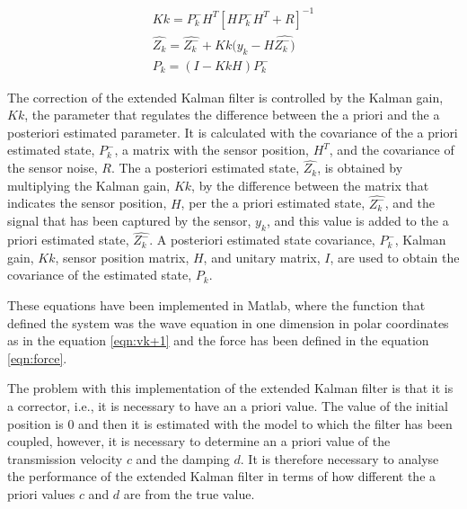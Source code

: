 \documentclass[12pt, a4paper]{article} %
\begin{document}
\begin{equation} \label{eqn:corrector}
    \begin{array}{ l }
    
    Kk = P_{k}^{-}H^{T}[HP_{k}^{-}H^{T} + R]^{-1} \\
    \hat{Z_{k}} = \hat{Z_{k}^{-}} + Kk(y_{k}-H\hat{Z_{k}^{-})} \\
    P_{k} = (I - KkH)P_{k}^{-}
    
    \end{array}
\end{equation}

The correction of the extended Kalman filter is controlled by the Kalman gain, $Kk$, the parameter that regulates the difference between the a priori and the a posteriori estimated parameter. It is calculated with the covariance of the a priori estimated state,  $P_{k}^{-}$, a matrix with the sensor position, $H^{T}$, and the covariance of the sensor noise, $R$. The a posteriori estimated state, $\hat{Z_{k}}$, is obtained by multiplying the Kalman gain, $Kk$, by the difference between the matrix that indicates the sensor position, $H$, per the a priori estimated state, $\hat{Z_{k}^{-}}$, and the signal that has been captured by the sensor, $y_{k}$, and this value is added to the a priori estimated state,  $\hat{Z_{k}^{-}}$. A posteriori estimated state covariance, $P_{k}^{-}$, Kalman gain, $Kk$, sensor position matrix, $H$, and unitary matrix, $I$, are used to obtain the covariance of the estimated state, $P_{k}$.

These equations have been implemented in Matlab, where the function that defined the system was the wave equation in one dimension in polar coordinates as in the equation \ref{eqn:vk+1} and the force has been defined in the equation \ref{eqn:force}. 

The problem with this implementation of the extended Kalman filter is that it is a corrector, i.e., it is necessary to have an a priori value. The value of the initial position is 0 and then it is estimated with the model to which the filter has been coupled, however, it is necessary to determine an a priori value of the transmission velocity $c$ and the damping $d$. It is therefore necessary to analyse the performance of the extended Kalman filter in terms of how different the a priori values $c$ and $d$ are from the true value.

\setlength{\parskip}{0mm}

\end{document}
